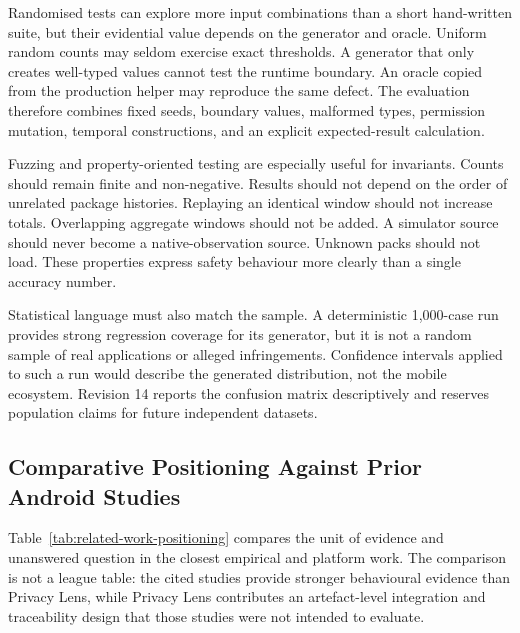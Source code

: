Randomised tests can explore more input combinations than a short hand-written suite, but their evidential value depends on the generator and oracle. Uniform random counts may seldom exercise exact thresholds. A generator that only creates well-typed values cannot test the runtime boundary. An oracle copied from the production helper may reproduce the same defect. The evaluation therefore combines fixed seeds, boundary values, malformed types, permission mutation, temporal constructions, and an explicit expected-result calculation.

Fuzzing and property-oriented testing are especially useful for invariants. Counts should remain finite and non-negative. Results should not depend on the order of unrelated package histories. Replaying an identical window should not increase totals. Overlapping aggregate windows should not be added. A simulator source should never become a native-observation source. Unknown packs should not load. These properties express safety behaviour more clearly than a single accuracy number.

Statistical language must also match the sample. A deterministic 1,000-case run provides strong regression coverage for its generator, but it is not a random sample of real applications or alleged infringements. Confidence intervals applied to such a run would describe the generated distribution, not the mobile ecosystem. Revision 14 reports the confusion matrix descriptively and reserves population claims for future independent datasets.

\subsection{Comparative Positioning Against Prior Android Studies}

Table~\ref{tab:related-work-positioning} compares the unit of evidence and unanswered question in the closest empirical and platform work. The comparison is not a league table: the cited studies provide stronger behavioural evidence than Privacy Lens, while Privacy Lens contributes an artefact-level integration and traceability design that those studies were not intended to evaluate.

